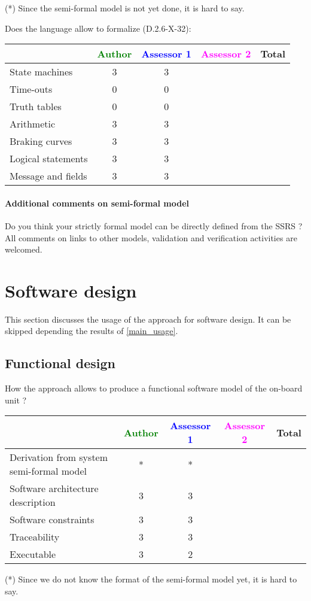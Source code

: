 \begin{author_comment}
(*) Since the semi-formal model is not yet done, it is hard to say.
\end{author_comment}
Does the language allow to  formalize (D.2.6-X-32):

\begin{tabular}{|l | c | c | c | c|}
\hline
& \textcolor{green}{Author} & \textcolor{blue}{Assessor 1} & \textcolor{magenta}{Assessor 2} & Total \\
\hline 
State machines  &3 &3 & &  \\
\hline
Time-outs  &0 &0 & &  \\
\hline
Truth tables  &0 &0 & &  \\
\hline
Arithmetic  &3 &3 & &  \\
\hline
Braking curves  &3 &3 & &  \\
\hline
Logical statements &3 &3 & &  \\
\hline
Message and fields &3 &3 & &  \\
\hline
\end{tabular}

\paragraph{Additional comments on semi-formal  model} Do you think your strictly formal  model can be directly defined from the SSRS ?
All comments on links to  other models, validation and verification activities are welcomed.


\section{Software design}
This section discusses the usage of the approach for software design.
It can be skipped depending the results of \ref{main_usage}.

\subsection{Functional design}

How the approach allows to  produce a functional software model of the on-board unit ?

\begin{tabular}{|l | c | c | c | c|}
\hline
& \textcolor{green}{Author} & \textcolor{blue}{Assessor 1} & \textcolor{magenta}{Assessor 2} & Total \\
\hline
Derivation from system semi-formal model  &* &* & &  \\
\hline 
Software architecture description  &3 &3 & &  \\
\hline
Software constraints  &3 &3 & &  \\
\hline
Traceability  &3 &3 & &  \\
\hline
Executable  &3 &2 & &  \\
\hline
\end{tabular}
\begin{author_comment}
(*) Since we do not know the format of the semi-formal model  yet, it is hard to say.
\end{author_comment}

